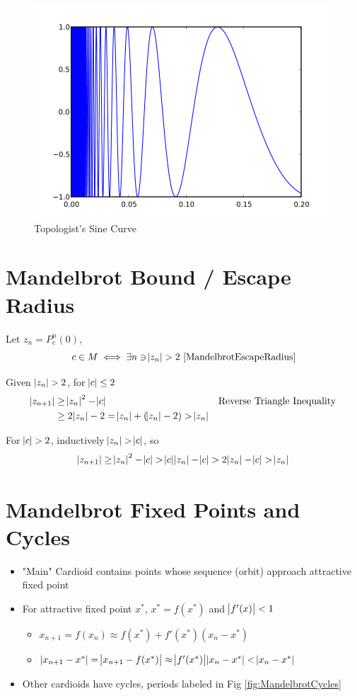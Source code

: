 \documentclass{article}
\begin{document}
\begin{figure}[!htbp]
    \centering
    \includegraphics[width=.4\linewidth]{images/420px-Topologist_sine_curve.png}
    \caption{Topologist's Sine Curve \cite{TopSineCurve}}%
\end{figure}



\section{Mandelbrot Bound / Escape Radius}

Let $z_n = P_c^n(0)$,
\[ c \in M \iff \exists n \ni \abs{z_n} > 2\ \text{\cite{MandelbrotEscapeRadius}}\]

Given $\abs{z_n} > 2$, for $\abs{c} \leq 2$
\begin{align*}
    \abs{z_{n+1}} &\geq \abs{z_n}^2 - \abs{c} &&\text{Reverse Triangle Inequality} \\
    &\geq 2\abs{z_n} - 2 = \abs{z_n} + (\abs{z_n} - 2) > \abs{z_n}
\end{align*}

For $\abs{c} > 2$, inductively $\abs{z_n} > \abs{c}$, so
\[ \abs{z_{n+1}} \geq \abs{z_n}^2 - \abs{c} > \abs{c}\abs{z_n} - \abs{c} > 2\abs{z_n} - \abs{c} > \abs{z_n} \] 


\section{Mandelbrot Fixed Points and Cycles}

\begin{itemize}
    \item "Main" Cardioid contains points whose sequence (orbit) approach attractive fixed point
    \item For attractive fixed point $x^*$, $x^* = f(x^*)$ and $\abs{f'(x)} < 1$
    \begin{itemize}
        \item $x_{n+1} = f(x_n) \approx f(x^*) + f'(x^*)(x_n - x^*)$
        \item $\abs{x_{n + 1} - x^*} = \abs{x_{n+1} - f(x^*)} \approx \abs{f'(x^*)}\abs{x_n - x^*} < \abs{x_n - x^*}$
    \end{itemize}
    \item Other cardioids have cycles, periods labeled in Fig \ref{fig:MandelbrotCycles}
\end{itemize}
\end{document}
